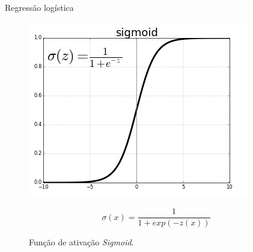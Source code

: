 \documentclass{beamer}
\begin{document}
\begin{frame}{Regressão logística}
    \begin{figure}[!ht]
        \centering
        \begin{minipage}[c]{0.4\textwidth}
            \includegraphics[width=\columnwidth]{Imagens/sigmoid-activation-function.jpg}
        \end{minipage}%
        \begin{minipage}{0.5\textwidth}
            \begin{equation} \sigma(x) = \frac{1} {1+ exp(-z(x))}\end{equation}
        \end{minipage}       
        \label{fig:sigmoid}
        \caption{Função de ativação \textit{Sigmoid}.}
    \end{figure}
\end{frame}
\end{document}

